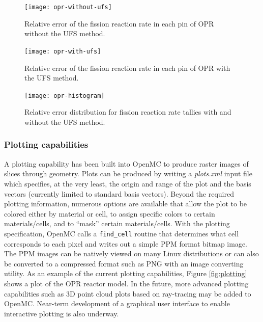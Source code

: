 \documentclass{ansconf}
\begin{document}
\begin{figure}[!htb]
  \begin{minipage}{0.45\textwidth}
    \centering
    \texttt{[image: opr-without-ufs]}
    \caption{Relative error of the fission reaction rate in each pin of OPR
      without the UFS method.}
    \label{fig:without-ufs}
  \end{minipage}
  \hspace{0.1\textwidth}
  \begin{minipage}{0.45\textwidth}
    \centering
    \texttt{[image: opr-with-ufs]}
    \caption{Relative error of the fission reaction rate in each pin of OPR with
      the UFS method.}
    \label{fig:with-ufs}
  \end{minipage}
\end{figure}

\begin{figure}[!htb]
  \centering
  \texttt{[image: opr-histogram]}
  \caption{Relative error distribution for fission reaction rate tallies with
    and without the UFS method.}
  \label{fig:histogram}
\end{figure}

\subsubsection{Plotting capabilities}

A plotting capability has been built into OpenMC to produce raster images of
slices through geometry. Plots can be produced by writing a \emph{plots.xml}
input file which specifies, at the very least, the origin and range of the plot
and the basis vectors (currently limited to standard basis vectors). Beyond the
required plotting information, numerous options are available that allow the
plot to be colored either by material or cell, to assign specific colors to
certain materials/cells, and to ``mask'' certain materials/cells. With the
plotting specification, OpenMC calls a \texttt{find\_cell} routine that
determines what cell corresponds to each pixel and writes out a simple PPM
format bitmap image. The PPM images can be natively viewed on many Linux
distributions or can also be converted to a compressed format such as PNG with
an image converting utility. As an example of the current plotting capabilities,
Figure \ref{fig:plotting} shows a plot of the OPR reactor model. In the future,
more advanced plotting capabilities such as 3D point cloud plots based on
ray-tracing may be added to OpenMC. Near-term development of a graphical user
interface to enable interactive plotting is also underway.
\end{document}
